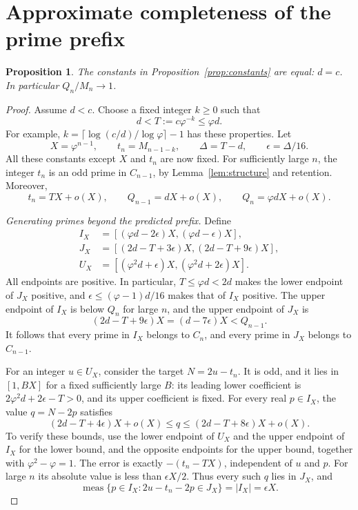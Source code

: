 \documentclass[11pt,letterpaper]{article}
\numberwithin{equation}{section}
\newtheorem{proposition}[theorem]{Proposition}
\theoremstyle{remark}
\DeclareMathOperator{\meas}{meas}
\newcommand{\ph}{\varphi}
\newcommand{\ceil}[1]{\lceil #1\rceil}
\begin{document}
\section{Approximate completeness of the prime prefix}

\begin{proposition}\label{prop:equal}
The constants in Proposition~\ref{prop:constants} are equal:
$d=c$. In particular $Q_n/M_n\to1$.
\end{proposition}

\begin{proof}
Assume $d<c$. Choose a fixed integer $k\ge0$ such that
\begin{equation}\label{eq:choose-T}
 d<T:=c\ph^{-k}\le\ph d.
\end{equation}
For example, $k=\ceil{\log(c/d)/\log\ph}-1$ has these properties.
Let
\[
 X=\ph^{n-1},\qquad t_n=M_{n-1-k},\qquad
 \Delta=T-d,\qquad \epsilon=\Delta/16.
\]
All these constants except $X$ and $t_n$ are now fixed.
For sufficiently large $n$, the integer $t_n$ is an odd prime in
$C_{n-1}$, by Lemma~\ref{lem:structure} and retention. Moreover,
\begin{equation}\label{eq:three-scales}
 t_n=TX+o(X),\qquad Q_{n-1}=dX+o(X),\qquad
 Q_n=\ph dX+o(X).
\end{equation}

\medskip\noindent\textit{Generating primes beyond the predicted prefix.}
Define
\begin{equation}\label{eq:three-intervals}
 \begin{aligned}
 I_X&=[(\ph d-2\epsilon)X,(\ph d-\epsilon)X],\\
 J_X&=[(2d-T+3\epsilon)X,(2d-T+9\epsilon)X],\\
 U_X&=[(\ph^2d+\epsilon)X,(\ph^2d+2\epsilon)X].
 \end{aligned}
\end{equation}
All endpoints are positive. In particular, $T\le\ph d<2d$ makes
the lower endpoint of $J_X$ positive, and
$\epsilon\le(\ph-1)d/16$ makes that of $I_X$ positive.
The upper endpoint of $I_X$ is below $Q_n$ for large $n$, and
the upper endpoint of $J_X$ is
\[
 (2d-T+9\epsilon)X=(d-7\epsilon)X<Q_{n-1}.
\]
It follows that every prime in $I_X$ belongs to $C_n$, and every
prime in $J_X$ belongs to $C_{n-1}$.

For an integer $u\in U_X$, consider the target $N=2u-t_n$.
It is odd, and it lies in $[1,BX]$ for a fixed sufficiently large
$B$: its leading lower coefficient is
$2\ph^2d+2\epsilon-T>0$, and its upper coefficient is fixed.
For every real $p\in I_X$, the value $q=N-2p$ satisfies
\begin{equation}\label{eq:q-margins}
 (2d-T+4\epsilon)X+o(X)
 \le q\le
 (2d-T+8\epsilon)X+o(X).
\end{equation}
To verify these bounds, use the lower endpoint of $U_X$ and the
upper endpoint of $I_X$ for the lower bound, and the opposite
endpoints for the upper bound, together with $\ph^2-\ph=1$.
The error is exactly $-(t_n-TX)$, independent of $u$ and $p$.
For large $n$ its absolute value is less than $\epsilon X/2$.
Thus every such $q$ lies in $J_X$, and
\[
 \meas\{p\in I_X:2u-t_n-2p\in J_X\}=|I_X|=\epsilon X.
\]


\end{proof}
\end{document}
